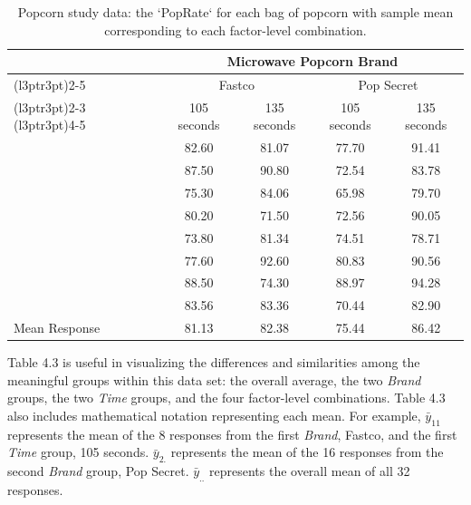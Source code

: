 \documentclass[
]{report}
\begin{document}
\begin{table}[!h]
\centering
\caption{\label{tab:tab42}Popcorn study data: the `PopRate` for each bag of popcorn with sample mean
corresponding to each factor-level combination.}
\centering
\begin{tabular}[t]{lcccc}
\toprule
\multicolumn{1}{c}{ } & \multicolumn{4}{c}{Microwave Popcorn Brand} \\
\cmidrule(l{3pt}r{3pt}){2-5}
\multicolumn{1}{c}{ } & \multicolumn{2}{c}{Fastco} & \multicolumn{2}{c}{Pop Secret} \\
\cmidrule(l{3pt}r{3pt}){2-3} \cmidrule(l{3pt}r{3pt}){4-5}
 & 105 seconds & 135 seconds & 105 seconds & 135 seconds\\
\midrule
 & 82.60 & 81.07 & 77.70 & 91.41\\
 & 87.50 & 90.80 & 72.54 & 83.78\\
 & 75.30 & 84.06 & 65.98 & 79.70\\
 & 80.20 & 71.50 & 72.56 & 90.05\\
 & 73.80 & 81.34 & 74.51 & 78.71\\
\addlinespace
 & 77.60 & 92.60 & 80.83 & 90.56\\
 & 88.50 & 74.30 & 88.97 & 94.28\\
 & 83.56 & 83.36 & 70.44 & 82.90\\
Mean Response & 81.13 & 82.38 & 75.44 & 86.42\\
\bottomrule
\end{tabular}
\end{table}

Table 4.3 is useful in visualizing the differences and similarities among the meaningful groups within this data set: the overall average, the two \emph{Brand} groups, the two \emph{Time} groups, and the four factor-level combinations. Table 4.3 also includes mathematical notation representing each mean. For example, \(\scriptstyle \bar{y}_{11}\) represents the mean of the 8 responses from the first \emph{Brand}, Fastco, and the first \emph{Time} group, 105 seconds. \(\scriptstyle \bar{y}_{2.}\) represents the mean of the 16 responses from the second \emph{Brand} group, Pop Secret. \(\scriptstyle \bar{y}_{..}\) represents the overall mean of all 32 responses.
\end{document}
